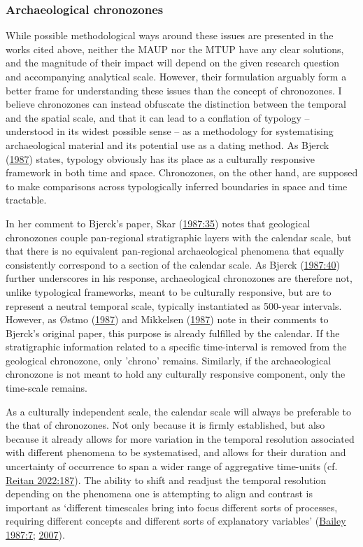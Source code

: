 \documentclass[
  a4paper,
  oneside]{uiophdthesis}
\begin{document}
\hypertarget{archaeological-chronozones}{%
\subsubsection{Archaeological chronozones}\label{archaeological-chronozones}}

While possible methodological ways around these issues are presented in the works cited above, neither the MAUP nor the MTUP have any clear solutions, and the magnitude of their impact will depend on the given research question and accompanying analytical scale. However, their formulation arguably form a better frame for understanding these issues than the concept of chronozones. I believe chronozones can instead obfuscate the distinction between the temporal and the spatial scale, and that it can lead to a conflation of typology -- understood in its widest possible sense -- as a methodology for systematising archaeological material and its potential use as a dating method. As Bjerck (\protect\hyperlink{ref-bjerck1987}{1987}) states, typology obviously has its place as a culturally responsive framework in both time and space. Chronozones, on the other hand, are supposed to make comparisons across typologically inferred boundaries in space and time tractable.

In her comment to Bjerck's paper, Skar (\protect\hyperlink{ref-skar1987}{1987:35}) notes that geological chronozones couple pan-regional stratigraphic layers with the calendar scale, but that there is no equivalent pan-regional archaeological phenomena that equally consistently correspond to a section of the calendar scale. As Bjerck (\protect\hyperlink{ref-bjerck1987}{1987:40}) further underscores in his response, archaeological chronozones are therefore not, unlike typological frameworks, meant to be culturally responsive, but are to represent a neutral temporal scale, typically instantiated as 500-year intervals. However, as Østmo (\protect\hyperlink{ref-uxf8stmo1987}{1987}) and Mikkelsen (\protect\hyperlink{ref-mikkelsen1987}{1987}) note in their comments to Bjerck's original paper, this purpose is already fulfilled by the calendar. If the stratigraphic information related to a specific time-interval is removed from the geological chronozone, only 'chrono' remains. Similarly, if the archaeological chronozone is not meant to hold any culturally responsive component, only the time-scale remains.

As a culturally independent scale, the calendar scale will always be preferable to the that of chronozones. Not only because it is firmly established, but also because it already allows for more variation in the temporal resolution associated with different phenomena to be systematised, and allows for their duration and uncertainty of occurrence to span a wider range of aggregative time-units (cf. \protect\hyperlink{ref-reitan2022}{Reitan 2022:187}). The ability to shift and readjust the temporal resolution depending on the phenomena one is attempting to align and contrast is important as `different timescales bring into focus different sorts of processes, requiring different concepts and different sorts of explanatory variables' (\protect\hyperlink{ref-bailey1987}{Bailey 1987:7}; \protect\hyperlink{ref-bailey2007}{2007}).
\end{document}
